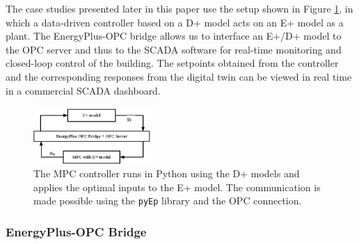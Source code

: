 
The case studies presented later in this paper use the setup shown in Figure \ref{F:control}, in which a data-driven controller based on a D+ model acts on an E+ model as a plant.
The EnergyPlus-OPC bridge allows us to interface an E+/D+ model to the OPC server and thus to the SCADA software for real-time monitoring and closed-loop control of the building.
The setpoints obtained from the controller and the corresponding responses from the digital twin can be viewed in real time in a commercial SCADA dashboard.

\begin{figure}[t]
	\centering
	\includegraphics[width=0.4\textwidth]{images/control.eps}
	\caption{The MPC controller runs in Python using the D+ models and applies the optimal inputs to the E+ model. The communication is made possible using the \texttt{pyEp} library and the OPC connection.}
	\label{F:control}
\end{figure}

\subsubsection{EnergyPlus-OPC Bridge}

